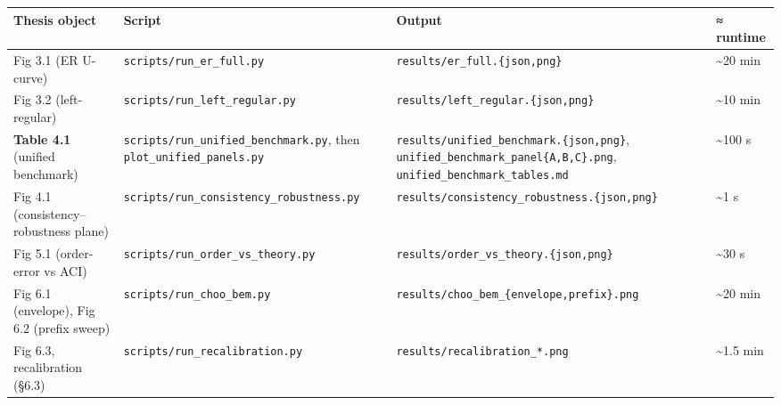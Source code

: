 {\footnotesize\setlength{\tabcolsep}{3pt}
{\def\LTcaptype{none} %
\begin{longtable}[]{@{}
  >{\raggedright\arraybackslash}p{}
  >{\raggedright\arraybackslash}p{}
  >{\raggedright\arraybackslash}p{}
  >{\raggedright\arraybackslash}p{}@{}}
\toprule\noalign{}
\begin{minipage}[b]{\linewidth}\raggedright
Thesis object
\end{minipage} & \begin{minipage}[b]{\linewidth}\raggedright
Script
\end{minipage} & \begin{minipage}[b]{\linewidth}\raggedright
Output
\end{minipage} & \begin{minipage}[b]{\linewidth}\raggedright
≈ runtime
\end{minipage} \\
\midrule\noalign{}
\endhead
\bottomrule\noalign{}
\endlastfoot
Fig 3.1 (ER U-curve) & \texttt{scripts/run\_er\_full.py} &
\texttt{results/er\_full.\{json,png\}} & \textasciitilde20 min \\
Fig 3.2 (left-regular) & \texttt{scripts/run\_left\_regular.py} &
\texttt{results/left\_regular.\{json,png\}} & \textasciitilde10 min \\
\textbf{Table 4.1} (unified benchmark) &
\texttt{scripts/run\_unified\_benchmark.py}, then
\texttt{plot\_unified\_panels.py} &
\texttt{results/unified\_benchmark.\{json,png\}},
\texttt{unified\_benchmark\_panel\{A,B,C\}.png},
\texttt{unified\_benchmark\_tables.md} & \textasciitilde100 s \\
Fig 4.1 (consistency--robustness plane) &
\texttt{scripts/run\_consistency\_robustness.py} &
\texttt{results/consistency\_robustness.\{json,png\}} & \textasciitilde1
s \\
Fig 5.1 (order-error vs ACI) &
\texttt{scripts/run\_order\_vs\_theory.py} &
\texttt{results/order\_vs\_theory.\{json,png\}} & \textasciitilde30 s \\
Fig 6.1 (envelope), Fig 6.2 (prefix sweep) &
\texttt{scripts/run\_choo\_bem.py} &
\texttt{results/choo\_bem\_\{envelope,prefix\}.png} & \textasciitilde20
min \\
Fig 6.3, recalibration (§6.3) & \texttt{scripts/run\_recalibration.py} &
\texttt{results/recalibration\_*.png} & \textasciitilde1.5 min \\

\end{longtable}}}
